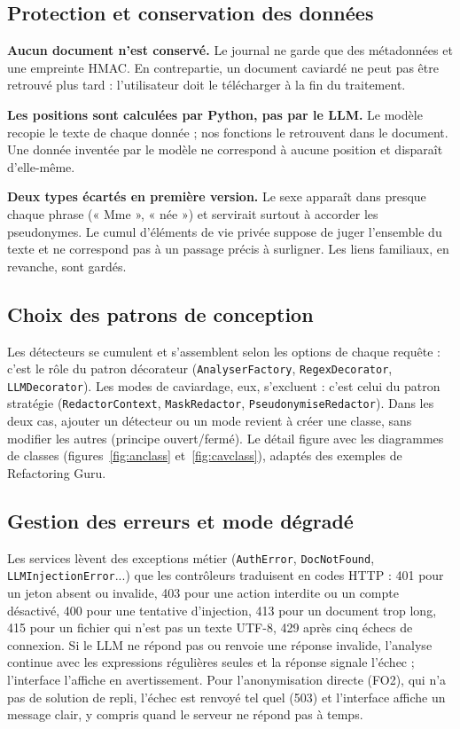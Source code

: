 \documentclass[12pt,a4paper]{article}
\begin{document}
\subsection{Protection et conservation des données}

\textbf{Aucun document n'est conservé.} Le journal ne garde que des métadonnées et une empreinte HMAC. En contrepartie, un document caviardé ne peut pas être retrouvé plus tard : l'utilisateur doit le télécharger à la fin du traitement.

\textbf{Les positions sont calculées par Python, pas par le LLM.} Le modèle recopie le texte de chaque donnée ; nos fonctions le retrouvent dans le document. Une donnée inventée par le modèle ne correspond à aucune position et disparaît d'elle-même.

\textbf{Deux types écartés en première version.} Le sexe apparaît dans presque chaque phrase (« Mme », « née ») et servirait surtout à accorder les pseudonymes. Le cumul d'éléments de vie privée suppose de juger l'ensemble du texte et ne correspond pas à un passage précis à surligner. Les liens familiaux, en revanche, sont gardés.

\subsection{Choix des patrons de conception}

Les détecteurs se cumulent et s'assemblent selon les options de chaque requête : c'est le rôle du patron décorateur (\texttt{AnalyserFactory}, \texttt{RegexDecorator}, \texttt{LLMDecorator}). Les modes de caviardage, eux, s'excluent : c'est celui du patron stratégie (\texttt{RedactorContext}, \texttt{MaskRedactor}, \texttt{PseudonymiseRedactor}). Dans les deux cas, ajouter un détecteur ou un mode revient à créer une classe, sans modifier les autres (principe ouvert/fermé). Le détail figure avec les diagrammes de classes (figures~\ref{fig:anclass} et~\ref{fig:cavclass}), adaptés des exemples de Refactoring Guru.

\subsection{Gestion des erreurs et mode dégradé}

Les services lèvent des exceptions métier (\texttt{AuthError}, \texttt{DocNotFound}, \texttt{LLMInjectionError}...) que les contrôleurs traduisent en codes HTTP : 401 pour un jeton absent ou invalide, 403 pour une action interdite ou un compte désactivé, 400 pour une tentative d'injection, 413 pour un document trop long, 415 pour un fichier qui n'est pas un texte UTF-8, 429 après cinq échecs de connexion. Si le LLM ne répond pas ou renvoie une réponse invalide, l'analyse continue avec les expressions régulières seules et la réponse signale l'échec ; l'interface l'affiche en avertissement. Pour l'anonymisation directe (FO2), qui n'a pas de solution de repli, l'échec est renvoyé tel quel (503) et l'interface affiche un message clair, y compris quand le serveur ne répond pas à temps.
\end{document}
